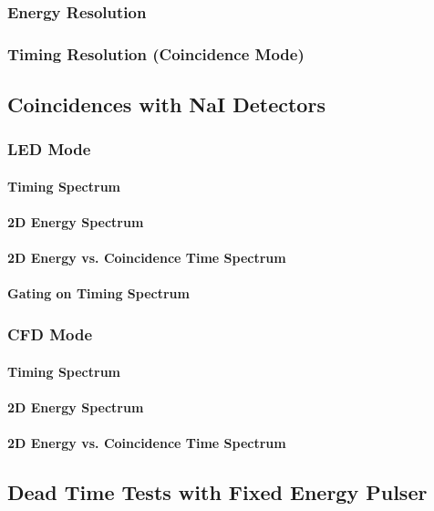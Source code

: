 \subsubsection{Energy Resolution}

\subsubsection{Timing Resolution (Coincidence Mode)}

\subsection{Coincidences with NaI Detectors}

\subsubsection{LED Mode}

\paragraph{Timing Spectrum}

\paragraph{2D Energy Spectrum}

\paragraph{2D Energy vs. Coincidence Time Spectrum}

\paragraph{Gating on Timing Spectrum}

\subsubsection{CFD Mode}

\paragraph{Timing Spectrum}

\paragraph{2D Energy Spectrum}

\paragraph{2D Energy vs. Coincidence Time Spectrum}

\subsection{Dead Time Tests with Fixed Energy Pulser}